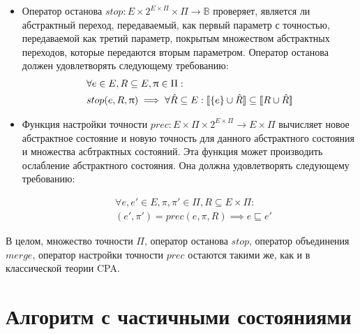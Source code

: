 \begin{itemize}
\item Оператор останова $stop: E \times 2^{E \times \Pi} \times \Pi \rightarrow \mathbb{B}$ проверяет, является ли абстрактный переход, передаваемый, как первый параметр с точностью, передаваемой как третий параметр, покрытым множеством абстрактных переходов, которые передаются вторым параметром.
Оператор останова должен удовлетворять следующему требованию:
\begin{equation}
\label{cpa_stop_eq}
\begin{aligned}
&\forall e \in E, R \subseteq E, \uppi \in \Pi:\\
&stop(e, R, \uppi) \implies\forall \hat R \subseteq E: [\![ \{e\}\cup \hat R ]\!] \subseteq [\![ R \cup \hat R ]\!]
\end{aligned}
\end{equation}

\item Функция настройки точности $prec:E \times \Pi \times 2^{E \times \Pi} \rightarrow E \times \Pi$ вычисляет новое абстрактное состояние и новую точность для данного абстрактного состояния и множества асбтрактных состояний.
Эта функция может производить ослабление абстрактного состояния.
Она должна удовлетворять следующему требованию:

\begin{equation}
\label{cpa_prec_eq}
\begin{aligned}
& \forall e, e' \in E, \pi, \pi' \in \Pi, R \subseteq E \times \Pi:\\
& (e', \pi') = prec(e, \pi, R) \implies e \sqsubseteq e'
\end{aligned}
\end{equation}

\end{itemize}

В целом, множество точности $\Pi$, оператор останова $stop$, оператор объединения $merge$, оператор настройки точности $prec$ остаются такими же, как и в классической теории CPA.

\section{Алгоритм с частичными состояниями}

